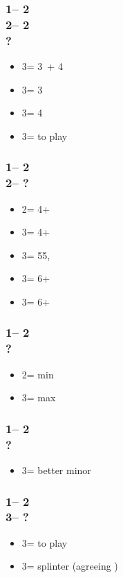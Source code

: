 \documentclass[12pt, a4paper]{article}
\begin{document}
\subsubsection*{1\nt -- 2\diams\\
                2\hearts -- 2\nt\\
                ?}
\begin{itemize}
    \item 3\clubs = 3\hearts\ + 4\clubs
    \item 3\diams = 3\hearts
    \item 3\hearts = 4\clubs
    \item 3\nt = to play
\end{itemize}

\subsubsection*{1\nt -- 2\hearts\\
                2\spades -- ?}
\begin{itemize}
    \item 2\nt = 4+\clubs\ \gf
    \item 3\clubs = 4+\diams\ \gf
    \item 3\diams = 55\major, \inv
    \item 3\hearts = 6+\spades\ \gf
    \item 3\spades = 6+\spades\ \inv
\end{itemize}

\subsubsection*{1\nt -- 2\spades\\
                ?}
\begin{itemize}
    \item 2\nt = min
    \item 3\clubs = max
\end{itemize}

\subsubsection*{1\nt -- 2\nt\\
                ?}
\begin{itemize}
    \item 3\minor = better minor
\end{itemize}

\subsubsection*{1\nt -- 2\nt\\
                3\minor -- ?}
\begin{itemize}
    \item 3\diams = to play
    \item 3\major = splinter (agreeing \diams)
\end{itemize}

\end{document}
